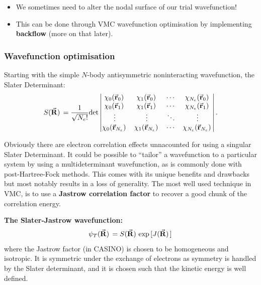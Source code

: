 \documentclass[10pt]{beamer}
\begin{document}
\begin{frame}[allowframebreaks]
    \begin{itemize}
        \item[\textbullet] We sometimes need to alter the nodal surface of our trial wavefunction!
        \item[\textbullet] This can be done through VMC wavefunction optimisation by implementing \textbf{backflow} (more on that later).
    \end{itemize}

\end{frame}

\begin{frame}[allowframebreaks]
    \frametitle{Wavefunction optimisation}
    Starting with the simple $N$-body antisymmetric noninteracting wavefunction, the Slater Determinant:
    \begin{equation}
        S\pqty*{\va{R}}=\frac{1}{\sqrt{N_e!}}\text{det}\vmqty{%
            \chi_0\pqty*{\va{r}_0}     & \chi_1\pqty*{\va{r}_0}     & \cdots & \chi_{N_e}\pqty*{\va{r}_0} \\
            \chi_0\pqty*{\va{r}_1}     & \chi_1\pqty*{\va{r}_1}     & \cdots & \chi_{N_e}\pqty*{\va{r}_1} \\
            \vdots                     & \vdots                     & \ddots & \vdots                     \\
            \chi_0\pqty*{\va{r}_{N_e}} & \chi_1\pqty*{\va{r}_{N_e}} & \cdots & \chi_{N_e}\pqty*{\va{r}_{N_e}}
        }.
    \end{equation}
    \framebreak%

    Obviously there are electron correlation effects unnacounted for using a singular Slater Determinant. It could be possible to ``tailor'' a wavefunction to a particular system by using a multideterminant wavefunction, as is commonly done with post-Hartree-Fock methods. This comes with its unique benefits and drawbacks but most notably results in a loss of generality.\medskip\newline
    The most well used technique in VMC, is to use a \textbf{Jastrow correlation factor} to recover a good chunk of the correlation energy.
    \framebreak%

    \textbf{The Slater-Jastrow wavefunction:}
    \begin{equation}
        \psi_T\pqty*{\va{R}}=S\pqty*{\va{R}}\exp\bqty*{J\pqty*{\va{R}}}
    \end{equation}
    where the Jastrow factor (in CASINO) is chosen to be homogeneous and isotropic. It is symmetric under the exchange of electrons as symmetry is handled by the Slater determinant, and it is chosen such that the kinetic energy is well defined.
    \framebreak%


\end{frame}
\end{document}
